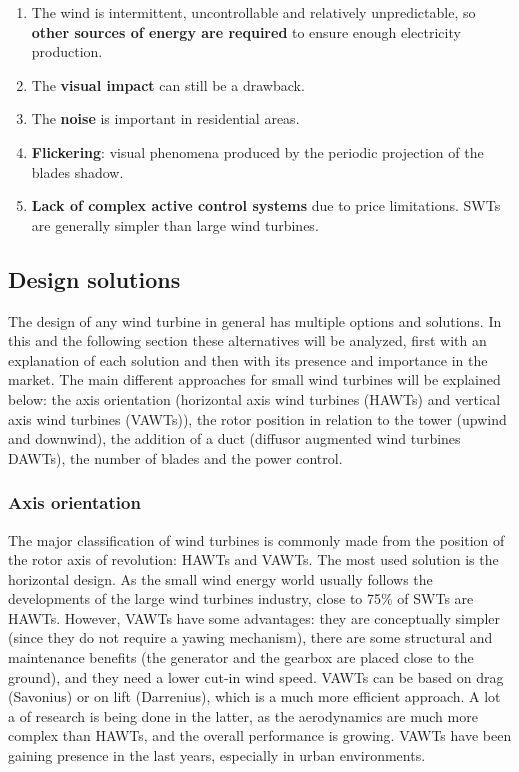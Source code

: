 \documentclass[../TFG_Report.tex]{subfiles}
\begin{document}
\begin{enumerate}
	\item The wind is intermittent, uncontrollable and relatively unpredictable, so \textbf{other sources of energy are required} to ensure enough electricity production.
	
	\item The \textbf{visual impact} can still be a drawback. 
	
	\item The \textbf{noise} is important in residential areas. 
	
	\item \textbf{Flickering}: visual phenomena produced by the periodic projection of the blades shadow. 
	
	\item \textbf{Lack of complex active control systems} due to price limitations. SWTs are generally simpler than large wind turbines. 
	
\end{enumerate}




	
\subsection{Design solutions}

The design of any wind turbine in general has multiple options and solutions. In this and the following section these alternatives will be analyzed, first with an explanation of each solution and then with its presence and importance in the market. The main different approaches for small wind turbines will be explained below: the axis orientation (horizontal axis wind turbines (HAWTs) and vertical axis wind turbines (VAWTs)), the rotor position in relation to the tower (upwind and downwind), the addition of a duct (diffusor augmented wind turbines DAWTs), the number of blades and the power control.   \\

\subsubsection{Axis orientation}

The major classification of wind turbines is commonly made from the position of the rotor axis of revolution: HAWTs and VAWTs. The most used solution is the horizontal design. As the small wind energy world usually follows the developments of the large wind turbines industry, close to 75\% of SWTs are HAWTs. However, VAWTs have some advantages: they are conceptually simpler (since they do not require a yawing mechanism), there are some structural and maintenance benefits (the generator and the gearbox are placed close to the ground), and they need a lower cut-in wind speed. VAWTs can be based on drag (Savonius) or on lift (Darrenius), which is a much more efficient approach. A lot a of research is being done in the latter, as the aerodynamics are much more complex than HAWTs, and the overall performance is growing. VAWTs have been gaining presence in the last years, especially in urban environments. \cite{Handbook} \cite{DesignControl}
\end{document}
